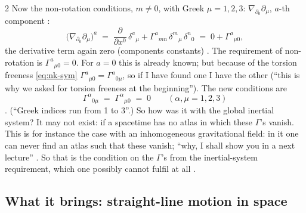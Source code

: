 \begin{paracol}{2}
Now the non-rotation conditions, $m\ne0$, with Greek $\mu=1,2,3$: $\nabla_{\partial_0}\partial_\mu$, $a$-th component :
\[
  \bigl(\nabla_{\partial_0}\partial_\mu\bigr)^a\;=\;\frac{\partial}{\partial x^0}\,\delta^a{}_\mu+\Gamma^a{}_{mn}\,\delta^m{}_\mu\,\delta^n{}_0
  \;=\;0+\Gamma^a{}_{\mu0} ,
\]
the derivative term again zero (components constants) . The requirement of non-rotation is $\Gamma^a{}_{\mu0}=0$. For $a=0$ this is already known; but because of the torsion freeness \eqref{eq:nk-sym} $\Gamma^a{}_{\mu0}=\Gamma^a{}_{0\mu}$, so
if I have found one I have the other (``this is why we asked for torsion freeness at the beginning''). The new conditions are
\begin{equation}\label{eq:nk-norot}
  \Gamma^\alpha{}_{0\mu}\;=\;\Gamma^\alpha{}_{\mu0}\;=\;0\qquad(\alpha,\mu=1,2,3)
\end{equation}
. (``Greek indices run from 1 to 3''.)
So how was it with the global inertial system? It may not exist: if a spacetime has no atlas in which these $\Gamma$'s vanish. This is for instance the case with an inhomogeneous gravitational field: in it one can never find an atlas such that these
vanish; ``why, I shall show you in a next lecture'' . So that is the condition on the $\Gamma$'s from the inertial-system requirement, which one possibly cannot fulfil at all .

\subsection{What it brings: straight-line motion in space}\label{ssec:nk-straight}


\end{paracol}
